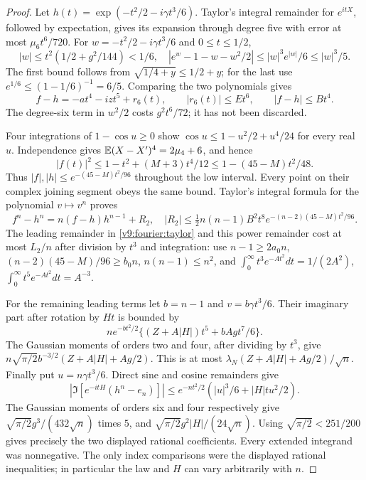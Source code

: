 \begin{proof}
Let $h(t)=\exp(-t^2/2-i\gamma t^3/6)$. Taylor's integral remainder
for $e^{itX}$, followed by expectation, gives its expansion through
degree five with error at most $\mu_6t^6/720$. For
$w=-t^2/2-i\gamma t^3/6$ and $0\le t\le1/2$,
\[
 |w|\le t^2(1/2+g^2/144)<1/6,
 \quad |e^w-1-w-w^2/2|\le |w|^3e^{|w|}/6\le |w|^3/5.
\]
The first bound follows from $\sqrt{1/4+y}\le1/2+y$; for the last
use $e^{1/6}\le(1-1/6)^{-1}=6/5$. Comparing the two polynomials gives
\begin{equation}\label{v9:fourier:taylor}
 f-h=-at^4-izt^5+r_6(t),\qquad |r_6(t)|\le Et^6,
 \qquad |f-h|\le Bt^4.
\end{equation}
The degree-six term in $w^2/2$ costs $g^2t^6/72$; it has not been
discarded.

Four integrations of $1-\cos u\ge0$ show
$\cos u\le1-u^2/2+u^4/24$ for every real $u$. Independence gives
$\mathbb E(X-X')^4=2\mu_4+6$, and hence
\[
 |f(t)|^2\le1-t^2+(M+3)t^4/12
 \le1-(45-M)t^2/48.
\]
Thus $|f|,|h|\le e^{-(45-M)t^2/96}$ throughout the low interval.
Every point on their complex joining segment obeys the same bound.
Taylor's integral formula for the polynomial $v\mapsto v^n$ proves
\[
 f^n-h^n=n(f-h)h^{n-1}+R_2,\quad
 |R_2|\le\tfrac12n(n-1)B^2t^8e^{-(n-2)(45-M)t^2/96}.
\]
The leading remainder in \eqref{v9:fourier:taylor} and this power
remainder cost at most $L_2/n$ after division by $t^3$ and integration:
use $n-1\ge2a_0n$, $(n-2)(45-M)/96\ge b_0n$, $n(n-1)\le n^2$,
and $\int_0^\infty t^3e^{-At^2}dt=1/(2A^2)$,
$\int_0^\infty t^5e^{-At^2}dt=A^{-3}$.

For the remaining leading terms let $b=n-1$ and
$v=b\gamma t^3/6$. Their imaginary part after rotation by $Ht$ is
bounded by
\[
 ne^{-bt^2/2}\{(Z+A|H|)t^5+bAg t^7/6\}.
\]
The Gaussian moments of orders two and four, after dividing by $t^3$,
give $n\sqrt{\pi/2}b^{-3/2}(Z+A|H|+Ag/2)$.
This is at most $\lambda_N(Z+A|H|+Ag/2)/\sqrt n$.
Finally put $u=n\gamma t^3/6$. Direct sine and cosine remainders give
\[
 |\Im[e^{-itH}(h^n-e_n)]|
 \le e^{-nt^2/2}(|u|^3/6+|H|t u^2/2).
\]
The Gaussian moments of orders six and four respectively give
$\sqrt{\pi/2}g^3/(432\sqrt n)$ times $5$, and
$\sqrt{\pi/2}g^2|H|/(24\sqrt n)$.
Using $\sqrt{\pi/2}<251/200$ gives precisely the two displayed
rational coefficients. Every extended integrand was nonnegative.
The only index comparisons were the displayed rational inequalities;
in particular the law and $H$ can vary arbitrarily with $n$.
\end{proof}

